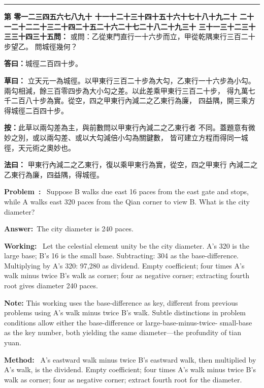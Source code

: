 \documentclass[9pt,a4paper]{article}
\newcounter{probnum}
\newcounter{overallnum}
\newcommand{\chnum}[1]{%
  \ifcase#1 零\or 一\or 二\or 三\or 四\or 五\or 六\or 七\or 八\or 九\or 十\or
    十一\or 十二\or 十三\or 十四\or 十五\or 十六\or 十七\or 十八\or 十九\or 二十\or
    二十一\or 二十二\or 二十三\or 二十四\or 二十五\or 二十六\or 二十七\or 二十八\or 二十九\or 三十\or
    三十一\or 三十二\or 三十三\or 三十四\or 三十五\fi}
\newcommand{\problem}[1]{\stepcounter{probnum}\stepcounter{overallnum}\par\noindent\textbf{\color{volcolor}第\chnum{\value{probnum}}問：}#1\par\vspace{0.15cm}}
\newcommand{\answer}[1]{\par\noindent\textbf{答曰：}#1\par\vspace{0.15cm}}
\newcommand{\working}[1]{\par\noindent\textbf{草曰：}#1\par\vspace{0.15cm}}
\newcommand{\method}[1]{\par\noindent\textbf{法曰：}#1\par\vspace{0.25cm}}
\newcommand{\eproblem}[1]{\par\noindent\textbf{\color{volcolor}Problem~\theoverallnum:}~#1\par\vspace{0.15cm}}
\newcommand{\eanswer}[1]{\par\noindent\textbf{Answer:}~#1\par\vspace{0.15cm}}
\newcommand{\eworking}[1]{\par\noindent\textbf{Working:}~#1\par\vspace{0.15cm}}
\newcommand{\emethod}[1]{\par\noindent\textbf{Method:}~#1\par\vspace{0.25cm}}
\begin{document}
\vspace{0.15cm}
\noindent\rule{\textwidth}{0.2pt}
\vspace{0.15cm}

\noindent\begin{minipage}[t]{0.48\textwidth}
\problem{
或問：乙從東門直行一十六步而立，甲從乾隅東行三百二十步望乙。
問城徑幾何？
}

\answer{城徑二百四十步。}

\working{
立天元一為城徑。以甲東行三百二十步為大勾，乙東行一十六步為小勾。
兩勾相減，餘三百零四步為大小勾之差。以此差乘甲東行三百二十步，
得九萬七千二百八十步為實。從空，四之甲東行內減二之乙東行為廉，
四益隅，開三乘方得城徑二百四十步。

\textbf{按：}此草以兩勾差為主，與前數問以甲東行內減二之乙東行者
不同。蓋題意有微妙之別，或以兩勾差、或以大勾減倍小勾為關鍵數，
皆可建立方程而得同一城徑，天元術之奧妙也。
}

\method{
甲東行內減二之乙東行，復以乘甲東行為實，從空，四之甲東行
內減二之乙東行為廉，四益隅，得城徑。
}
\end{minipage}%
\hfill%
\begin{minipage}[t]{0.50\textwidth}
\eproblem{
Suppose B walks due east 16 paces from the east gate and stops, while A walks
east 320 paces from the Qian corner to view B. What is the city diameter?
}

\eanswer{The city diameter is 240 paces.}

\eworking{
Let the celestial element unity be the city diameter. A's 320 is the large
base; B's 16 is the small base. Subtracting: 304 as the base-difference.
Multiplying by A's 320: 97,280 as dividend. Empty coefficient; four times
A's walk minus twice B's walk as corner; four as negative corner; extracting
fourth root gives diameter 240 paces.

\textbf{Note:} This working uses the base-difference as key, different from
previous problems using A's walk minus twice B's walk. Subtle distinctions in
problem conditions allow either the base-difference or large-base-minus-twice-
small-base as the key number, both yielding the same diameter---the profundity
of tian yuan.
}

\emethod{
A's eastward walk minus twice B's eastward walk, then multiplied by A's walk,
is the dividend. Empty coefficient; four times A's walk minus twice B's walk
as corner; four as negative corner; extract fourth root for the diameter.
}
\end{minipage}
\vspace{0.15cm}
\end{document}
